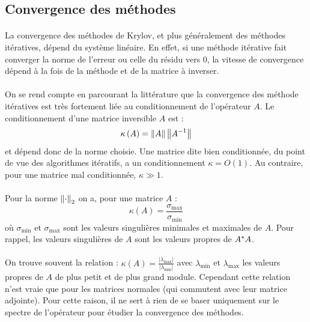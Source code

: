 	\subsection{Convergence des méthodes}

		\paragraph{}
		La convergence des méthodes de Krylov, et plus généralement des méthodes itératives, dépend du système linéaire.
		En effet, si une méthode itérative fait converger la norme de l'erreur ou celle du résidu vers 0, la vitesse de convergence dépend à la fois de la méthode et de la matrice à inverser.

		\paragraph{}
		On se rend compte en parcourant la littérature \cite{Nevanlinna1994} que la convergence des méthode itératives est très fortement liée au conditionnement de l'opérateur $A$.
		Le conditionnement d'une matrice inversible $A$ est :
		\[\kappa\left(A\right) = \norm{A}\norm{A^{-1}}\]
		et dépend donc de la norme choisie.
		Une matrice dite bien conditionnée, du point de vue des algorithmes itératifs, a un conditionnement $\kappa = O\left(1\right)$.
		Au contraire, pour une matrice mal conditionnée, $\kappa\gg1$.

		\paragraph{}
		Pour la norme $\norm[2]{\cdot}$ on a, pour une matrice $A$ :
		\begin{equation}\label{eq:conditionnement}
			\kappa\left(A\right) = \frac{\sigma_{\max}}{\sigma_{\min}}
		\end{equation}
		où $\sigma_{\min}$ et $\sigma_{\max}$ sont les valeurs singulières minimales et maximales de $A$.
		Pour rappel, les valeurs singulières de $A$ sont les valeurs propres de ${A}^*A$.

		\paragraph{}
		On trouve souvent la relation : $\kappa\left(A\right) = \frac{\left|\lambda_{\max}\right|}{\left|\lambda_{\min}\right|}$ avec $\lambda_{\min}$ et $\lambda_{\max}$ les valeurs propres de $A$ de plus petit et de plus grand module.
		Cependant cette relation n'est vraie que pour les matrices normales (qui commutent avec leur matrice adjointe).
		Pour cette raison, il ne sert à rien de se baser uniquement sur le spectre de l'opérateur pour étudier la convergence des méthodes.

